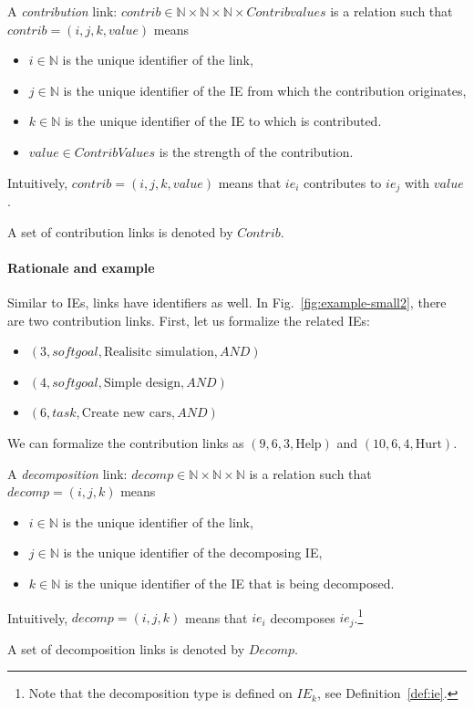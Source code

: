 \begin{definition}
\label{def:link:contrib}
A \emph{contribution} link: $contrib\in \mathbb{N}\times\mathbb{N}\times\mathbb{N}\times Contribvalues$ is a relation such that $contrib = (i,j,k,value)$ means
\begin{itemize}
\item $i\in \mathbb{N}$ is the unique identifier of the link,
\item $j\in \mathbb{N}$ is the unique identifier of the IE from which the contribution originates,
\item $k\in \mathbb{N}$ is the unique identifier of the IE to which is contributed.
\item $value\in ContribValues$ is the strength of the contribution.
\end{itemize}
Intuitively, $contrib = (i,j,k,value)$ means that $ie_i$ contributes to $ie_j$ with $value$.

A set of contribution links is denoted by $Contrib$.
\end{definition}

\paragraph{Rationale and example} Similar to IEs, links have identifiers as well. In Fig.~\ref{fig:example-small2}, there are two contribution links. First, let us formalize the related IEs:
\begin{itemize}
\item $(3, softgoal, \text{Realisitc simulation}, AND)$
\item $(4, softgoal, \text{Simple design}, AND)$
\item $(6, task, \text{Create new cars}, AND)$
\end{itemize}

We can formalize the contribution links as $(9, 6, 3, \text{Help})$ and $(10, 6, 4, \text{Hurt})$.

\begin{definition}
\label{def:link:decomp}
A \emph{decomposition} link: $decomp\in \mathbb{N}\times\mathbb{N}\times\mathbb{N}$ is a relation such that $decomp = (i,j,k)$ means
\begin{itemize}
\item $i\in \mathbb{N}$ is the unique identifier of the link,
\item $j\in \mathbb{N}$ is the unique identifier of the decomposing IE,
\item $k\in \mathbb{N}$ is the unique identifier of the IE that is being decomposed.
\end{itemize}
Intuitively, $decomp = (i,j,k)$ means that $ie_i$ decomposes $ie_j$.\footnote{Note that the decomposition type is defined on $IE_{k}$, see Definition~\ref{def:ie}.}

A set of decomposition links is denoted by $Decomp$.
\end{definition}

